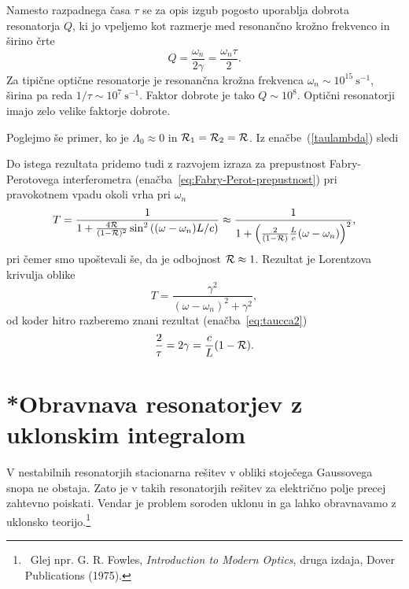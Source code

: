 \begin{remark}
Namesto razpadnega časa $\tau$ se za opis izgub pogosto uporablja
dobrota resonatorja $Q$, ki jo vpeljemo kot
razmerje med resonančno krožno frekvenco in širino črte 
\begin{equation}
\label{eq:qdef}
Q=\frac{\omega_{n}}{2\gamma} = \frac{\omega_{n}\tau}{2}.
\end{equation}
Za tipične optične resonatorje je resonančna krožna
frekvenca $\omega_n \sim 10^{15}~\si{\second}^{-1}$, širina pa reda 
 $1/\tau \sim 10^{7}~\si{\second}^{-1}$. Faktor dobrote je tako $Q \sim 10^{8}$. Optični 
 resonatorji imajo zelo velike faktorje dobrote.
\end{remark}

Poglejmo še primer, ko je $\Lambda_0 \approx 0$ in ${\cal R}_1 = {\cal R}_2 = {\cal R}$.
Iz enačbe~(\ref{taulambda}) sledi

Do istega rezultata pridemo tudi z razvojem izraza za prepustnost Fabry-Perotovega 
interferometra (enačba~\ref{eq:Fabry-Perot-prepustnost}) 
pri pravokotnem vpadu okoli vrha pri $\omega_{n}$
\begin{equation}
T=\frac{1}{1+\frac{4{\cal R}}{(1-{\cal R})^{2}}\sin^{2}\left((\omega-\omega_{n})L/c\right)}\approx 
\frac{1}{1+\left(\frac{2}{(1-{\cal R})}\frac{L}{c}(\omega-\omega_{n})\right)^{2}},
\label{3.27}
\end{equation}
pri čemer smo upoštevali še, da je odbojnost ${\cal R} \approx 1$. 
Rezultat je Lorentzova krivulja oblike
 \begin{equation}
 T = \frac{\gamma^2}{(\omega - \omega_n)^2+\gamma^2},
 \label{eq:FBi2}
 \end{equation}
od koder hitro razberemo znani rezultat (enačba~\ref{eq:taucca2})
\begin{equation}
\frac{2}{\tau}=2\gamma = \frac{c}{L}(1-{\cal R}).
\end{equation}

\section{*Obravnava resonatorjev z uklonskim integralom}
\label{Resonator_uklon}

V nestabilnih resonatorjih stacionarna rešitev v obliki stoječega
Gaussovega snopa ne obstaja. Zato je v takih resonatorjih rešitev za električno polje precej
zahtevno poiskati. Vendar je problem soroden uklonu in ga lahko obravnavamo z 
uklonsko teorijo.\footnote{~Glej npr. G. R. Fowles, {\it 
Introduction to Modern Optics}, druga izdaja, Dover Publications (1975).}

